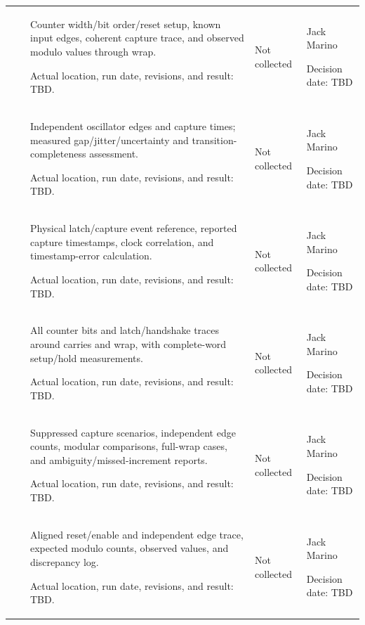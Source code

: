 \begin{landscape}
\begin{tabularx}{\linewidth}{L{2.0cm}L{3.3cm}Y L{2.3cm}L{2.6cm}}
 & \par {} & Counter width/bit order/reset setup, known input edges, coherent capture trace, and observed modulo values through wrap.\par Actual location, run date, revisions, and result: TBD. & Not collected & Jack Marino\par Decision date: TBD\\
 & \par {} & Independent oscillator edges and capture times; measured gap/jitter/uncertainty and transition-completeness assessment.\par Actual location, run date, revisions, and result: TBD. & Not collected & Jack Marino\par Decision date: TBD\\
 & \par {} & Physical latch/capture event reference, reported capture timestamps, clock correlation, and timestamp-error calculation.\par Actual location, run date, revisions, and result: TBD. & Not collected & Jack Marino\par Decision date: TBD\\
 & \par {} & All counter bits and latch/handshake traces around carries and wrap, with complete-word setup/hold measurements.\par Actual location, run date, revisions, and result: TBD. & Not collected & Jack Marino\par Decision date: TBD\\
 & \par {} & Suppressed capture scenarios, independent edge counts, modular comparisons, full-wrap cases, and ambiguity/missed-increment reports.\par Actual location, run date, revisions, and result: TBD. & Not collected & Jack Marino\par Decision date: TBD\\
 & \par {} & Aligned reset/enable and independent edge trace, expected modulo counts, observed values, and discrepancy log.\par Actual location, run date, revisions, and result: TBD. & Not collected & Jack Marino\par Decision date: TBD\\

\end{tabularx}
\end{landscape}
